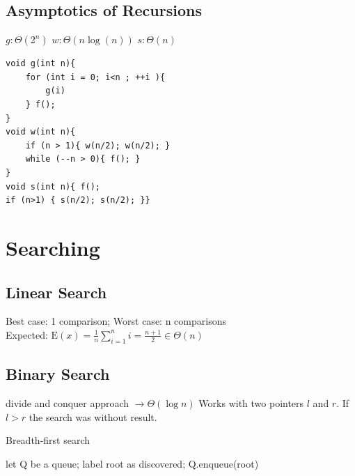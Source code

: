 \documentclass[9pt,landscape,a4paper, table]{extarticle}
\begin{document}
\begin{multicols*}{3}
\subsection{Asymptotics of Recursions}

$g: \Theta (2^n)$ $w: \Theta(n\log(n))$ $s: \Theta(n)$
\begin{verbatim}
void g(int n){
    for (int i = 0; i<n ; ++i ){
        g(i)
    } f();
}
void w(int n){
    if (n > 1){ w(n/2); w(n/2); } 
    while (--n > 0){ f(); }
}
void s(int n){ f(); 
if (n>1) { s(n/2); s(n/2); }}
\end{verbatim}


\section{Searching}

\subsection{Linear Search}

Best case: 1 comparison; 
Worst case: n comparisons\\
Expected: $\mathrm{E}(x) = \frac{1}{n}\sum_{i=1}^n i = \frac{n+1}{2} \in \Theta(n)$

\subsection{Binary Search}
divide and conquer approach $\rightarrow \Theta(\log n)$
Works with two pointers $l$ and $r$. If $l > r$ the search was without result.

{\scriptsize
\begin{algorithm}[H]
    \caption{Breadth-first search}
    
    \SetAlgoLined
    let Q be a queue; label root as discovered; Q.enqueue(root)\\
\end{algorithm}}


\end{multicols*}
\end{document}
